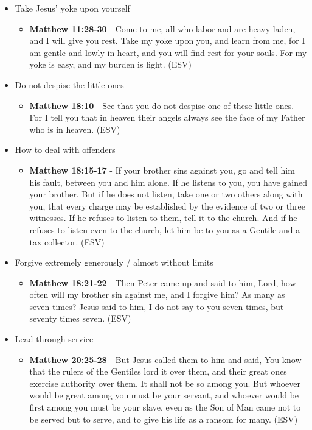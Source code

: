 \documentclass[11pt]{article}
\begin{document}
\begin{itemize}
\begin{itemize}
\end{itemize}
\item Take Jesus' yoke upon yourself
\begin{itemize}
\item \textbf{Matthew 11:28-30} - Come to me, all who labor and are heavy laden, and I will give you rest. Take my yoke upon you, and learn from me, for I am gentle and lowly in heart, and you will find rest for your souls. For my yoke is easy, and my burden is light. (ESV)
\end{itemize}
\item Do not despise the little ones
\begin{itemize}
\item \textbf{Matthew 18:10} - See that you do not despise one of these little ones. For I tell you that in heaven their angels always see the face of my Father who is in heaven. (ESV)
\end{itemize}
\item How to deal with offenders
\begin{itemize}
\item \textbf{Matthew 18:15-17} - If your brother sins against you, go and tell him his fault, between you and him alone. If he listens to you, you have gained your brother. But if he does not listen, take one or two others along with you, that every charge may be established by the evidence of two or three witnesses. If he refuses to listen to them, tell it to the church. And if he refuses to listen even to the church, let him be to you as a Gentile and a tax collector. (ESV)
\end{itemize}
\item Forgive extremely generously / almost without limits
\begin{itemize}
\item \textbf{Matthew 18:21-22} - Then Peter came up and said to him, Lord, how often will my brother sin against me, and I forgive him? As many as seven times? Jesus said to him, I do not say to you seven times, but seventy times seven. (ESV)
\end{itemize}
\item Lead through service
\begin{itemize}
\item \textbf{Matthew 20:25-28} - But Jesus called them to him and said, You know that the rulers of the Gentiles lord it over them, and their great ones exercise authority over them. It shall not be so among you. But whoever would be great among you must be your servant, and whoever would be first among you must be your slave, even as the Son of Man came not to be served but to serve, and to give his life as a ransom for many. (ESV)

\end{itemize}
\end{itemize}
\end{document}
